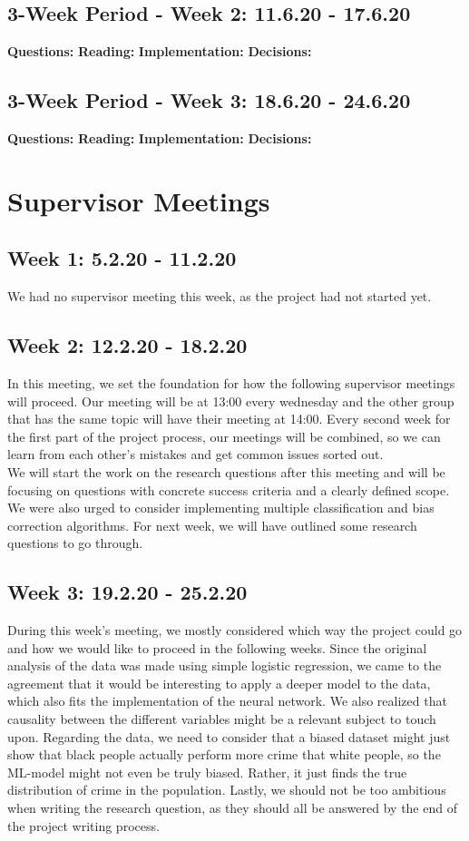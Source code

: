 \documentclass[11pt, fleqn]{article}
\begin{document}
\subsection*{3-Week Period - Week 2: 11.6.20 - 17.6.20}
\textbf{Questions:} 
\textbf{Reading:} 
\textbf{Implementation:} 
\textbf{Decisions:} 

\subsection*{3-Week Period - Week 3: 18.6.20 - 24.6.20}
\textbf{Questions:} 
\textbf{Reading:} 
\textbf{Implementation:} 
\textbf{Decisions:} 


\section*{Supervisor Meetings}

\subsection*{Week 1: 5.2.20 - 11.2.20}
We had no supervisor meeting this week, as the project had not started yet.

\subsection*{Week 2: 12.2.20 - 18.2.20}
In this meeting, we set the foundation for how the following supervisor meetings will proceed. Our meeting will be at 13:00 every wednesday and the other group that has the same topic will have their meeting at 14:00. Every second week for the first part of the project process, our meetings will be combined, so we can learn from each other's mistakes and get common issues sorted out. \\
We will start the work on the research questions after this meeting and will be focusing on questions with concrete success criteria and a clearly defined scope. We were also urged to consider implementing multiple classification and bias correction algorithms. For next week, we will have outlined some research questions to go through.

\subsection*{Week 3: 19.2.20 - 25.2.20}
During this week's meeting, we mostly considered which way the project could go and how we would like to proceed in the following weeks. Since the original analysis of the data was made using simple logistic regression, we came to the agreement that it would be interesting to apply a deeper model to the data, which also fits the implementation of the neural network. We also realized that causality between the different variables might be a relevant subject to touch upon. Regarding the data, we need to consider that a biased dataset might just show that black people actually perform more crime that white people, so the ML-model might not even be truly biased. Rather, it just finds the true distribution of crime in the population. Lastly, we should not be too ambitious when writing the research question, as they should all be answered by the end of the project writing process.
\end{document}

